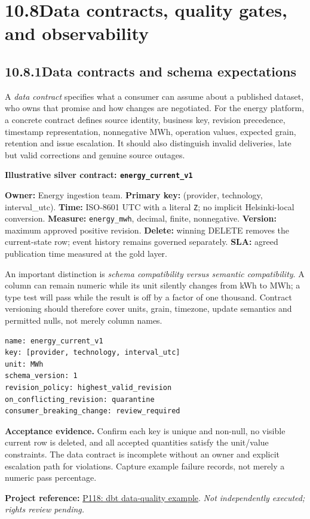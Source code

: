 \documentclass[11pt,twoside]{article}
\newcommand{\topic}[2]{\subsection*{#1\quad #2}}
\newcommand{\repo}[2]{\par\begingroup\fontsize{8.0}{9.6}\selectfont\sffamily\color{inkgray}\textbf{Project reference:} \href{#2}{#1}. \textit{Not independently executed; rights review pending.}\par\endgroup}
\begin{document}
\section*{10.8\quad Data contracts, quality gates, and observability}
\topic{10.8.1}{Data contracts and schema expectations}
A \emph{data contract} specifies what a consumer can assume about a published dataset, who owns that promise and how changes are negotiated. For the energy platform, a concrete contract defines source identity, business key, revision precedence, timestamp representation, nonnegative MWh, operation values, expected grain, retention and issue escalation. It should also distinguish invalid deliveries, late but valid corrections and genuine source outages.
\begin{whitebox}\textbf{Illustrative silver contract: \texttt{energy\_current\_v1}}\par
\textbf{Owner:} Energy ingestion team. \textbf{Primary key:} (provider, technology, interval\_utc). \textbf{Time:} ISO-8601 UTC with a literal \texttt{Z}; no implicit Helsinki-local conversion. \textbf{Measure:} \texttt{energy\_mwh}, decimal, finite, nonnegative. \textbf{Version:} maximum approved positive revision. \textbf{Delete:} winning DELETE removes the current-state row; event history remains governed separately. \textbf{SLA:} agreed publication time measured at the gold layer.\end{whitebox}
An important distinction is \emph{schema compatibility versus semantic compatibility}. A column can remain numeric while its unit silently changes from kWh to MWh; a type test will pass while the result is off by a factor of one thousand. Contract versioning should therefore cover units, grain, timezone, update semantics and permitted nulls, not merely column names.
\begin{lstlisting}[caption={Compact contract excerpt; companion includes the full version.}]
name: energy_current_v1
key: [provider, technology, interval_utc]
unit: MWh
schema_version: 1
revision_policy: highest_valid_revision
on_conflicting_revision: quarantine
consumer_breaking_change: review_required
\end{lstlisting}
\textbf{Acceptance evidence.} Confirm each key is unique and non-null, no visible current row is deleted, and all accepted quantities satisfy the unit/value constraints. The data contract is incomplete without an owner and explicit escalation path for violations. Capture example failure records, not merely a numeric pass percentage.
\repo{P118: dbt data-quality example}{https://github.com/Divergent-Insights/dbt-dataquality}
\end{document}
